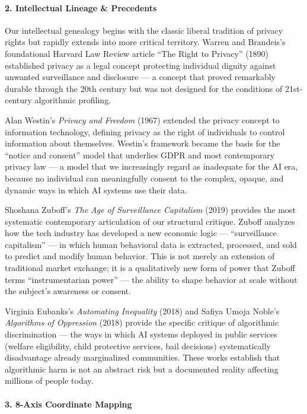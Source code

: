 \paragraph{2. Intellectual Lineage \&
Precedents}\label{intellectual-lineage-precedents-34}

Our intellectual genealogy begins with the classic liberal tradition of
privacy rights but rapidly extends into more critical territory. Warren
and Brandeis's foundational Harvard Law Review article ``The Right to
Privacy'' (1890) established privacy as a legal concept protecting
individual dignity against unwanted surveillance and disclosure --- a
concept that proved remarkably durable through the 20th century but was
not designed for the conditions of 21st-century algorithmic profiling.

Alan Westin's \emph{Privacy and Freedom} (1967) extended the privacy
concept to information technology, defining privacy as the right of
individuals to control information about themselves. Westin's framework
became the basis for the ``notice and consent'' model that underlies
GDPR and most contemporary privacy law --- a model that we increasingly
regard as inadequate for the AI era, because no individual can
meaningfully consent to the complex, opaque, and dynamic ways in which
AI systems use their data.

Shoshana Zuboff's \emph{The Age of Surveillance Capitalism} (2019)
provides the most systematic contemporary articulation of our structural
critique. Zuboff analyzes how the tech industry has developed a new
economic logic --- ``surveillance capitalism'' --- in which human
behavioral data is extracted, processed, and sold to predict and modify
human behavior. This is not merely an extension of traditional market
exchange; it is a qualitatively new form of power that Zuboff terms
``instrumentarian power'' --- the ability to shape behavior at scale
without the subject's awareness or consent.

Virginia Eubanks's \emph{Automating Inequality} (2018) and Safiya Umoja
Noble's \emph{Algorithms of Oppression} (2018) provide the specific
critique of algorithmic discrimination --- the ways in which AI systems
deployed in public services (welfare eligibility, child protective
services, bail decisions) systematically disadvantage already
marginalized communities. These works establish that algorithmic harm is
not an abstract risk but a documented reality affecting millions of
people today.

\paragraph{3. 8-Axis Coordinate
Mapping}\label{axis-coordinate-mapping-34}

